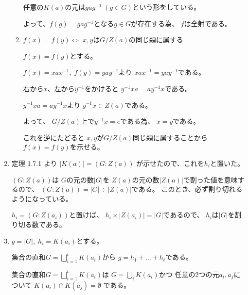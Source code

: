 \documentclass[12pt,b5paper]{ltjsarticle}
\begin{document}
\begin{enumerate}
\begin{enumerate}
              \dotfill

              任意の$K(a)$の元は$gag^{-1} \; (g\in G)$という形をしている。

              よって、$f(g)=gag^{-1}$となる$g\in G$が存在する為、
              $f$は全射である。

              \hrulefill

        \item $f(x)=f(y) \Leftrightarrow$ $x,y$は$G/Z(a)$の同じ類に属する

              \dotfill


              $f(x)=f(y)$とする。

              $f(x) = xax^{-1}, \; f(y)=yay^{-1}$より
              $xax^{-1}=yay^{-1}$である。

              右から$x$、左から$y^{-1}$をかけると
              $y^{-1}xa = ay^{-1}x$である。

              $y^{-1}xa = ay^{-1}x$より
              $y^{-1}x \in Z(a)$である。

              よって、
              $G/Z(a)$上で$y^{-1}x = e$である為、
              $x=y$である。

              これを逆にたどると
              $x,y$が$G/Z(a)$同じ類に属することから$f(x)=f(y)$を示せる。


              \hrulefill

       \end{enumerate}

 \item
      定理 1.7.1 より $|K(a)| = (G:Z(a))$ が示せたので、これを$h_{i}$と置いた。
      

      $(G:Z(a))$は $G$の元の数$|G|$を
      $Z(a)$の元の数$|Z(a)|$で割った値を意味するので、
      $(G:Z(a)) = |G| \div |Z(a)|$である。
      このとき、必ず割り切れるようになっている。

      $h_{i}=(G:Z(a_{i}))$と置けば、
      $h_{i}\times |Z(a_{i})| = |G|$であるので、
      $h_{i}$は$|G|$を割り切る数である。

      \hrulefill

 \item $g=|G|,\; h_{i}=K(a_{i})$とする。

       集合の直和$G = \bigsqcup_{i=1}^{t} K(a_{i})$から
       $g=h_{1}+\dots + h_{t}$である。

       \dotfill

       集合の直和$G = \bigsqcup_{i=1}^{t} K(a_{i})$は
       $G = \bigcup_{i} K(a_{i})$かつ
       任意の2つの元$a_{i},a_{j}$について
       $K(a_{i}) \cap K(a_{j}) = \emptyset$
       である。


\end{enumerate}
\end{document}
